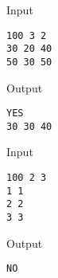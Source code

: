 Input
\begin{verbatim}
100 3 2
30 20 40
50 30 50\end{verbatim}

Output
\begin{verbatim}
YES
30 30 40\end{verbatim}

Input
\begin{verbatim}
100 2 3
1 1
2 2
3 3\end{verbatim}

Output
\begin{verbatim}
NO\end{verbatim}